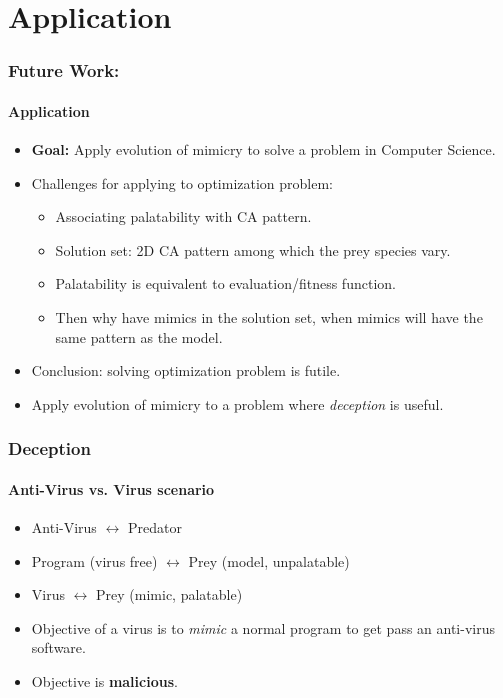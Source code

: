 \section{Application}

\frame
{
	\frametitle{Future Work:}
	\framesubtitle{Application}
	
	\begin{itemize}
		\item \textbf{Goal:} Apply evolution of mimicry to solve a problem in Computer Science.
		\item Challenges for applying to optimization problem:
			\begin{itemize}
				\item Associating palatability with CA pattern.
				\item Solution set: 2D CA pattern among which the prey species vary.
				\item Palatability is equivalent to evaluation/fitness function.
				\item Then why have mimics in the solution set, when mimics will have the same pattern as the model.
			\end{itemize}
		\item Conclusion: solving optimization problem is futile.
		\item Apply evolution of mimicry to a problem where \textit{deception} is useful.
	\end{itemize}
}

\frame
{
	\frametitle{Deception}
	\framesubtitle{Anti-Virus vs. Virus scenario}

	\begin{itemize}
		\item Anti-Virus \(\leftrightarrow\) Predator
		\item Program (virus free) \(\leftrightarrow\) Prey (model, unpalatable)
		\item Virus \(\leftrightarrow\) Prey (mimic, palatable)
	\end{itemize}
	
	\begin{itemize}
		\item Objective of a virus is to \textit{mimic} a normal program to get pass an anti-virus software.
		\item Objective is \textbf{malicious}.
	\end{itemize}
}